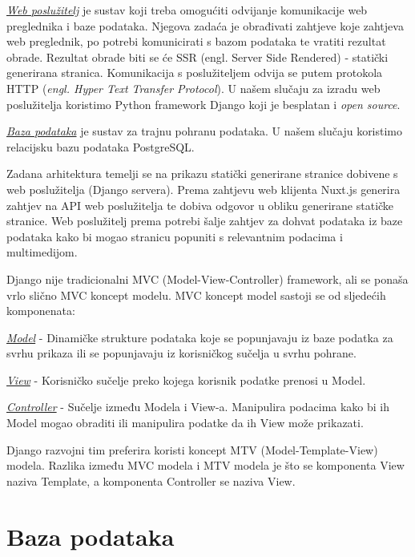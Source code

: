	\underline{\textit{Web poslužitelj}} je sustav koji treba omogućiti odvijanje komunikacije web preglednika i baze podataka. Njegova zadaća je obrađivati zahtjeve koje zahtjeva web preglednik, po potrebi komunicirati s bazom podataka te vratiti rezultat obrade. Rezultat obrade biti se će SSR (engl. Server Side Rendered) - statički generirana stranica. Komunikacija s poslužiteljem odvija se putem protokola HTTP (\emph{engl. Hyper Text Transfer Protocol}). U našem slučaju za izradu web poslužitelja koristimo Python framework Django koji je besplatan i \emph{open source}.

	\underline{\textit{Baza podataka}} je sustav za trajnu pohranu podataka. U našem slučaju koristimo relacijsku bazu podataka PostgreSQL.

	Zadana arhitektura temelji se na prikazu statički generirane stranice dobivene s web poslužitelja (Django servera). Prema zahtjevu web klijenta Nuxt.js generira zahtjev na API web poslužitelja te dobiva odgovor u obliku generirane statičke stranice. Web poslužitelj prema potrebi šalje zahtjev za dohvat podataka iz baze podataka kako bi mogao stranicu popuniti s relevantnim podacima i multimedijom.

	Django nije tradicionalni MVC (Model-View-Controller) framework, ali se ponaša vrlo slično MVC koncept modelu. MVC koncept model sastoji se od sljedećih komponenata: 
	\begin{packed_item}
		\item{\underline{\textit{Model}} - Dinamičke strukture podataka koje se popunjavaju iz baze podatka za svrhu prikaza ili se popunjavaju iz korisničkog sučelja u svrhu pohrane.}
		\item{\underline{\textit{View}} - Korisničko sučelje preko kojega korisnik podatke prenosi u Model.}
		\item{\underline{\textit{Controller}} - Sučelje između Modela i View-a. Manipulira podacima kako bi ih Model mogao obraditi ili manipulira podatke da ih View može prikazati.}
	\end{packed_item}

	Django razvojni tim preferira koristi koncept MTV (Model-Template-View) modela. Razlika između MVC modela i MTV modela je što se komponenta View naziva Template, a komponenta Controller se naziva View.

	\pagebreak
				
	\section{Baza podataka}
			
